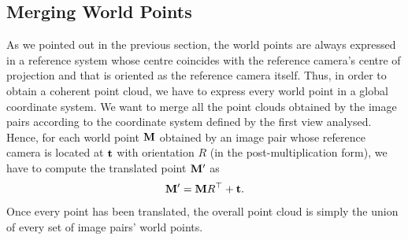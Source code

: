 \subsection{Merging World Points}\label{subsec:merging_worldPoints}
As we pointed out in the previous section, the world points are always
expressed in a reference system whose centre coincides with the reference
camera's centre of projection and that is oriented as the reference camera
itself.
Thus, in order to obtain a coherent point cloud, we have to express every world
point in a global coordinate system.
We want to merge all the point clouds obtained by the image pairs
according to the coordinate system defined
by the first view analysed. Hence, for each world point $\mathbf{M}$ obtained by
an image pair whose reference camera is located at $\mathbf{t}$ with orientation
$R$ (in the post-multiplication form), we have to compute the translated point $\mathbf{M}^\prime$ as
%
\begin{equation*}
\mathbf{M}^\prime = \mathbf{M} R^\top + \mathbf{t} \text{.}
\end{equation*}
%
\noindent Once every point has been translated, the overall point cloud is
simply the union of every set of image pairs' world points.
